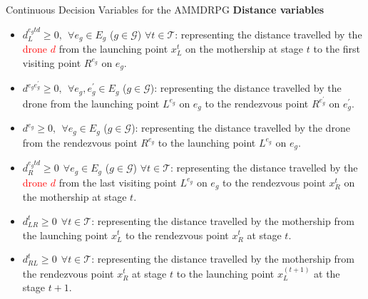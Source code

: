 \documentclass[slidestop,usepdftitle=false,10pt]{beamer}
\begin{document}
    \begin{frame}{Continuous Decision Variables for the AMMDRPG}
    \textbf{Distance variables}
    \begin{itemize}
        \footnotesize
        \item $d_L^{e_gtd} \geq 0, \:\: \forall e_g \in E_g$ ($g \in \mathcal{G}$) $\forall t \in \mathcal T$: representing the distance travelled by the \textcolor{red}{drone $d$} from the launching point $x_L^t$ on the mothership at stage $t$ to the first visiting point $R^{e_g}$ on $e_g$.
        \item $d^{e_ge^\prime_g} \geq 0, \:\: \forall e_g, e^\prime_g \in E_g $ ($g \in \mathcal{G}$): representing the distance travelled by the drone from the launching
        point $L^{e_g}$ on $e_g$ to the rendezvous point $R^{e^\prime_g}$ on $e^\prime_g$.
        \item $d^{e_g} \geq 0, \:\: \forall e_g \in E_g$ ($g \in \mathcal{G}$): representing the distance travelled by the drone from the rendezvous point $R^{e_g}$ to the launching point $L^{e_g}$ on $e_g$. 
        \item $d_R^{e_gtd} \geq 0 \:\: \forall e_g \in E_g$ ($g \in \mathcal{G}$) $\forall t \in \mathcal T$: representing the distance travelled by the \textcolor{red}{drone $d$} from the last
        visiting point $L^{e_g}$ on $e_g$ to the rendezvous point $x_R^t$ on the mothership at stage $t$.
        \item $d_{LR}^t \geq 0 \:\: \forall t \in \mathcal T$: representing the distance travelled by the mothership from the launching point $x_L^t$ to the rendezvous point $x_R^t$ at stage $t$.
        \item $d_{RL}^t \geq 0 \:\: \forall t \in \mathcal T$: representing the distance travelled by the mothership from the rendezvous point $x_R^t$ at stage $t$ to the launching point $x_L^{(t+1)}$ at the stage $t+1$.
    \end{itemize}
	\end{frame}
\end{document}
